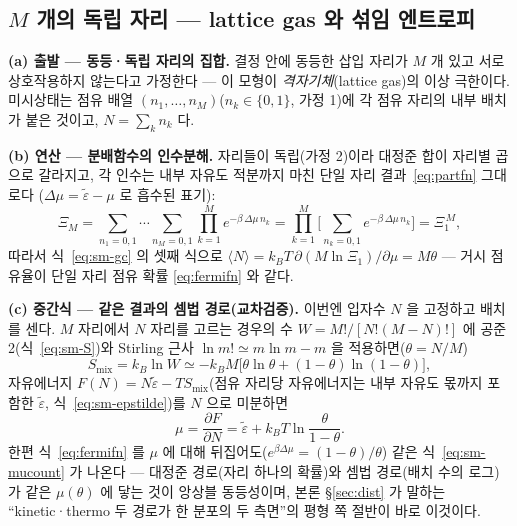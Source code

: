 \subsection{$M$ 개의 독립 자리 --- lattice gas 와 섞임 엔트로피}\label{sec:sm-lattice}
\textbf{(a) 출발 --- 동등·독립 자리의 집합.} 결정 안에 동등한 삽입 자리가 $M$ 개 있고 서로 상호작용하지
않는다고 가정한다 --- 이 모형이 \emph{격자기체}(lattice gas)의 이상 극한이다. 미시상태는 점유 배열
$(n_1,\dots,n_M)$($n_k\in\{0,1\}$, 가정 1)에 각 점유 자리의 내부 배치가 붙은 것이고, $N=\sum_kn_k$ 다.

\textbf{(b) 연산 --- 분배함수의 인수분해.} 자리들이 독립(가정 2)이라 대정준 합이 자리별 곱으로 갈라지고,
각 인수는 내부 자유도 적분까지 마친 단일 자리 결과~\eqref{eq:partfn} 그대로다
($\Delta\mu=\tilde\varepsilon-\mu$ 로 흡수된 표기):
\begin{equation}
\Xi_M=\sum_{n_1=0,1}\!\cdots\!\sum_{n_M=0,1}\prod_{k=1}^{M}e^{-\beta\,\Delta\mu\,n_k}
=\prod_{k=1}^{M}\Big[\sum_{n_k=0,1}e^{-\beta\,\Delta\mu\,n_k}\Big]=\Xi_1^{\,M},
\label{eq:sm-factor}
\end{equation}
따라서 식~\eqref{eq:sm-gc} 의 셋째 식으로 $\langle N\rangle=k_BT\,\partial(M\ln\Xi_1)/\partial\mu=M\theta$ ---
거시 점유율이 단일 자리 점유 확률 \eqref{eq:fermifn} 와 같다.

\textbf{(c) 중간식 --- 같은 결과의 셈법 경로(교차검증).} 이번엔 입자수 $N$ 을 고정하고 배치를 센다.
$M$ 자리에서 $N$ 자리를 고르는 경우의 수 $W=M!/[N!(M-N)!]$ 에 공준 2(식~\eqref{eq:sm-S})와 Stirling 근사
$\ln m!\simeq m\ln m-m$ 을 적용하면($\theta=N/M$)
\begin{equation}
S_\mathrm{mix}=k_B\ln W\simeq-k_BM\big[\theta\ln\theta+(1-\theta)\ln(1-\theta)\big],
\label{eq:sm-Smix}
\end{equation}
자유에너지 $F(N)=N\tilde\varepsilon-TS_\mathrm{mix}$(점유 자리당 자유에너지는 내부 자유도 몫까지 포함한
$\tilde\varepsilon$, 식~\eqref{eq:sm-epstilde})를 $N$ 으로 미분하면
\begin{equation}
\mu=\frac{\partial F}{\partial N}
=\tilde\varepsilon+k_BT\ln\frac{\theta}{1-\theta}.
\label{eq:sm-mucount}
\end{equation}
한편 식~\eqref{eq:fermifn} 를 $\mu$ 에 대해 뒤집어도($e^{\beta\Delta\mu}=(1-\theta)/\theta$) 같은
식~\eqref{eq:sm-mucount} 가 나온다 --- 대정준 경로(자리 하나의 확률)와 셈법 경로(배치 수의 로그)가 같은
$\mu(\theta)$ 에 닿는 것이 앙상블 동등성이며, 본론 \S\ref{sec:dist} 가 말하는 ``kinetic·thermo 두 경로가 한
분포의 두 측면''의 평형 쪽 절반이 바로 이것이다.

